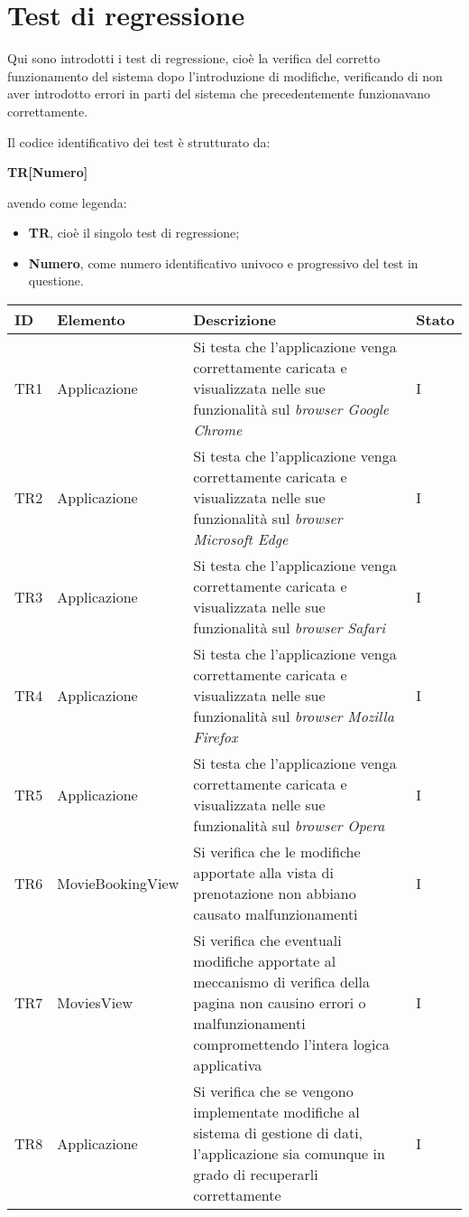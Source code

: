 \clearpage

\section{Test di regressione}\label{sec:verifica-validazione-regressione}

Qui sono introdotti i test di regressione, cioè la verifica del corretto funzionamento del sistema dopo l'introduzione di modifiche, verificando di non aver 
introdotto errori in parti del sistema che precedentemente funzionavano correttamente.

Il codice identificativo dei test è strutturato da:
\begin{center}
    \textbf{TR[Numero]}
  \end{center}
\textbf{}
avendo come legenda:
\begin{itemize}
\item \textbf{TR}, cioè il singolo test di regressione;
\item \textbf{Numero}, come numero identificativo univoco e progressivo del test in questione.
\end{itemize}

\begin{center}
\label{tab:test-regressione}
\begin{longtable}{|D{1.5cm}|D{3.0cm}|D{8.5cm}|D{1.5cm}|}
\hline
\textbf{ID} & \textbf{Elemento} & \textbf{Descrizione} & \textbf{Stato} \\
\hline
TR1 & Applicazione & Si testa che l'applicazione venga correttamente caricata e visualizzata nelle sue funzionalità sul \textit{browser Google Chrome} & I \\
\hline
TR2 & Applicazione & Si testa che l'applicazione venga correttamente caricata e visualizzata nelle sue funzionalità sul \textit{browser Microsoft Edge} & I \\
\hline
TR3 & Applicazione & Si testa che l'applicazione venga correttamente caricata e visualizzata nelle sue funzionalità sul \textit{browser Safari} & I \\
\hline
TR4 & Applicazione & Si testa che l'applicazione venga correttamente caricata e visualizzata nelle sue funzionalità sul \textit{browser Mozilla Firefox} & I \\
\hline
TR5 & Applicazione & Si testa che l'applicazione venga correttamente caricata e visualizzata nelle sue funzionalità sul \textit{browser Opera} & I \\
\hline
TR6 & MovieBookingView & Si verifica che le modifiche apportate alla vista di prenotazione non abbiano causato malfunzionamenti & I \\
\hline
TR7 & MoviesView & Si verifica che eventuali modifiche apportate al meccanismo di verifica della pagina non causino errori o malfunzionamenti compromettendo l'intera logica applicativa & I \\
\hline
TR8 & Applicazione & Si verifica che se vengono implementate modifiche al sistema di gestione di dati, l'applicazione sia comunque in grado di recuperarli correttamente & I \\
\hline
\end{longtable}
\end{center}

